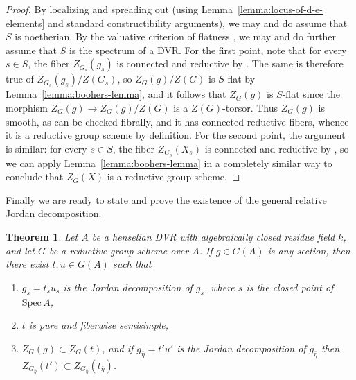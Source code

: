 \documentclass[11pt,reqno]{amsart}
\newtheorem{theorem}{Theorem}[section]
\theoremstyle{definition}
\newcommand{\Spec}{\mathrm{Spec} \,}
\begin{document}
\begin{proof}
By localizing and spreading out (using Lemma~\ref{lemma:locus-of-d-e-elements} and standard constructibility arguments), we may and do assume that $S$ is noetherian. By the valuative criterion of flatness \cite[IV\textsubscript{3}, Thm.\ 11.8.1]{EGA}, we may and do further assume that $S$ is the spectrum of a DVR. For the first point, note that for every $s \in S$, the fiber $Z_{G_s}(g_s)$ is connected and reductive by \cite[Thm.\ 2.15]{SteinbergTorsion}. The same is therefore true of $Z_{G_s}(g_s)/Z(G_s)$, so $Z_G(g)/Z(G)$ is $S$-flat by Lemma~\ref{lemma:boohers-lemma}, and it follows that $Z_G(g)$ is $S$-flat since the morphism $Z_G(g) \to Z_G(g)/Z(G)$ is a $Z(G)$-torsor. Thus $Z_G(g)$ is smooth, as can be checked fibrally, and it has connected reductive fibers, whence it is a reductive group scheme by definition. For the second point, the argument is similar: for every $s \in S$, the fiber $Z_{G_s}(X_s)$ is connected and reductive by \cite[Prop.\ 3.7]{Integral-Springer}, so we can apply Lemma~\ref{lemma:boohers-lemma} in a completely similar way to conclude that $Z_G(X)$ is a reductive group scheme.
\end{proof}

Finally we are ready to state and prove the existence of the general relative Jordan decomposition.

\begin{theorem}\label{theorem:relative-jordan-decomposition}
Let $A$ be a henselian DVR with algebraically closed residue field $k$, and let $G$ be a reductive group scheme over $A$. If $g \in G(A)$ is any section, then there exist $t, u \in G(A)$ such that
\begin{enumerate}
    \item\label{item:general-jordan-special-fiber} $g_s = t_s u_s$ is the Jordan decomposition of $g_s$, where $s$ is the closed point of $\Spec A$,
    \item\label{item:general-jordan-pure} $t$ is pure and fiberwise semisimple,
    \item\label{item:general-jordan-commute} $Z_G(g) \subset Z_G(t)$, and if $g_{\overline{\eta}} = t' u'$ is the Jordan decomposition of $g_{\overline{\eta}}$ then $Z_{G_{\overline{\eta}}}(t') \subset Z_{G_{\overline{\eta}}}(t_{\overline{\eta}})$.
\end{enumerate}
\end{theorem}
\end{document}
